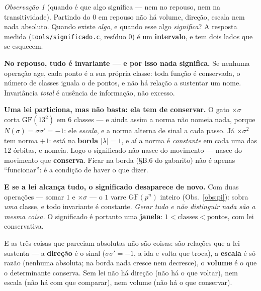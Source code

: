 \documentclass[11pt]{article}
\newcommand{\code}[1]{\texttt{\small #1}}
\newcommand{\GF}{\mathrm{GF}}
\theoremstyle{plain}
\theoremstyle{remark}
\newtheorem{obs}{Observação}
\begin{document}
\begin{obs}[quando é que algo significa --- nem no repouso, nem na transitividade]\label{obs:signif}
Partindo do $0$ em repouso não há volume, direção, escala nem nada absoluto. Quando existe \emph{algo},
e quando esse algo \emph{significa}? A resposta medida (\code{tools/significado.c}, resíduo $0$) é um
\textbf{intervalo}, e tem dois lados que se esquecem.

\textbf{No repouso, tudo é invariante --- e por isso nada significa.} Se nenhuma operação age, cada
ponto é a sua própria classe: toda função é conservada, o número de classes iguala o de pontos, e não
há relação a sustentar um nome. Invariância \emph{total} é ausência de informação, não excesso.

\textbf{Uma lei particiona, mas não basta: ela tem de conservar.} O gato $\times\sigma$ corta
$\GF(13^2)$ em $6$ classes --- e ainda assim a norma não nomeia nada, porque $N(\sigma)=\sigma\sigma'=-1$:
ele \emph{escala}, e a norma alterna de sinal a cada passo. Já $\times\sigma^2$ tem norma $+1$: está na
\textbf{borda} $|\lambda|=1$, e aí a norma é \emph{constante} em cada uma das $12$ órbitas, e nomeia.
Logo o significado não nasce do movimento --- nasce do movimento que \textbf{conserva}. Ficar na borda
(§B.6 do gabarito) não é apenas ``funcionar'': é a condição de haver o que dizer.

\textbf{E se a lei alcança tudo, o significado desaparece de novo.} Com duas operações --- somar $1$ e
$\times\sigma$ --- o $1$ varre $\GF(p^n)$ inteiro (Obs.~\ref{obs:pi}): sobra \emph{uma} classe, e todo
invariante é constante. \emph{Gerar tudo e não distinguir nada são a mesma coisa.} O significado é
portanto uma \textbf{janela}: $1<\text{classes}<\text{pontos}$, com lei conservativa.

E as três coisas que pareciam absolutas não são coisas: são relações que a lei sustenta --- a
\textbf{direção} é o sinal ($\sigma\sigma'=-1$, a ida e volta que troca), a \textbf{escala} é só razão
(nenhuma absoluta; na borda nada cresce nem decresce), o \textbf{volume} é o que o determinante conserva.
Sem lei não há direção (não há o que voltar), nem escala (não há com que comparar), nem volume (não há o
que conservar).
\end{obs}
\end{document}
